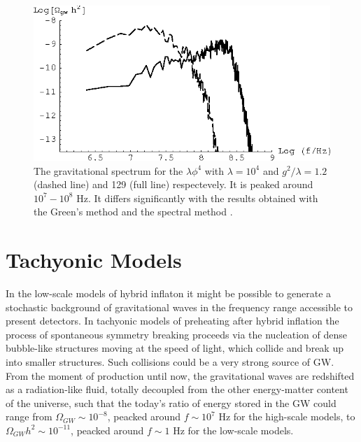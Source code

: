 \documentclass[11pt,a4paper,twoside]{book}
\begin{document}
 \begin{figure}[h]
 	\centering
 	\includegraphics[width=0.6\linewidth, height=0.35\textheight]{Images/Chap7/BoxMethod_Fig1}
 	\caption{The gravitational spectrum for the $ \lambda \phi^{4} $ with $\lambda=10^{4}$ and $ g^{2}/\lambda=1.2 $ (dashed line) and 129 (full line) respectevely. It is peaked around $ 10^{7}-10^{8} $ Hz. It differs significantly with the results obtained with the Green's method and the spectral method \cite{Chap7:BoxMethod}.}
 	\label{fig:boxmethodfig1}
 \end{figure}
 
 \newpage
 
\section{Tachyonic Models}
In the low-scale models of hybrid inflaton it might be possible to generate a stochastic background of gravitational waves in the frequency range accessible to present detectors. In tachyonic models of preheating after hybrid inflation the process of spontaneous symmetry breaking proceeds via the nucleation of dense bubble-like structures moving at the speed of light, which collide and break up into smaller structures. Such collisions could be a very strong source of GW. From the moment of production until now, the gravitational waves are redshifted as a radiation-like fluid, totally decoupled from the other  energy-matter content of the universe, such that the today's ratio of energy stored in the GW could range from $ \Omega_{GW}\sim 10^{-8} $, peacked around $ f \sim 10^{7} $ Hz for the high-scale models, to $ \Omega_{GW}h^{2}\sim 10^{-11} $, peacked around $ f\sim 1 $ Hz for the low-scale models.
\end{document}

